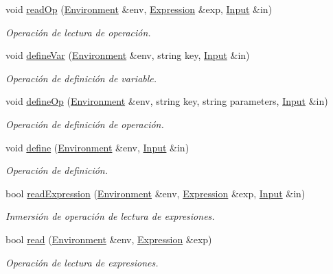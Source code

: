 \begin{DoxyCompactItemize}
void \hyperlink{_functions_i_o_8hh_acb31c57a06915fe17eee64989f500f0d}{read\+Op} (\hyperlink{class_environment}{Environment} \&env, \hyperlink{class_expression}{Expression} \&exp, \hyperlink{class_input}{Input} \&in)
\begin{DoxyCompactList}\small\item\em Operación de lectura de operación. \end{DoxyCompactList}\item 
void \hyperlink{_functions_i_o_8hh_a2b0504402167c389ef8c7de12d41149b}{define\+Var} (\hyperlink{class_environment}{Environment} \&env, string key, \hyperlink{class_input}{Input} \&in)
\begin{DoxyCompactList}\small\item\em Operación de definición de variable. \end{DoxyCompactList}\item 
void \hyperlink{_functions_i_o_8hh_a39e6424c2643bf6ddf2e5ff8a8c342e9}{define\+Op} (\hyperlink{class_environment}{Environment} \&env, string key, string parameters, \hyperlink{class_input}{Input} \&in)
\begin{DoxyCompactList}\small\item\em Operación de definición de operación. \end{DoxyCompactList}\item 
void \hyperlink{_functions_i_o_8hh_a65f523a256e113ca2711c3972157df26}{define} (\hyperlink{class_environment}{Environment} \&env, \hyperlink{class_input}{Input} \&in)
\begin{DoxyCompactList}\small\item\em Operación de definición. \end{DoxyCompactList}\item 
bool \hyperlink{_functions_i_o_8hh_a0c2a0ba0f4fe2dfe26ec14053ce4d408}{read\+Expression} (\hyperlink{class_environment}{Environment} \&env, \hyperlink{class_expression}{Expression} \&exp, \hyperlink{class_input}{Input} \&in)
\begin{DoxyCompactList}\small\item\em Inmersión de operación de lectura de expresiones. \end{DoxyCompactList}\item 
bool \hyperlink{_functions_i_o_8hh_a10264ecdb3196a71243b69fd4f98c229}{read} (\hyperlink{class_environment}{Environment} \&env, \hyperlink{class_expression}{Expression} \&exp)
\begin{DoxyCompactList}\small\item\em Operación de lectura de expresiones. \end{DoxyCompactList}\end{DoxyCompactItemize}



